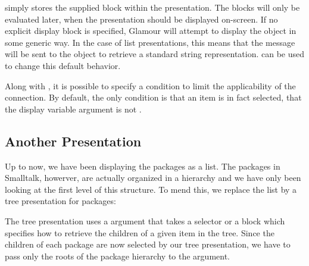 \documentclass[a4paper,10pt,twoside]{book}
\begin{document}
 simply stores the supplied block within the
presentation. The blocks will only be evaluated later, when the
presentation should be displayed on-screen. If no explicit display
block is specified, Glamour will attempt to display the object in some
generic way. In the case of list presentations, this means that the
 message will be sent to the object to retrieve a
standard string representation.  can be used to change
this default behavior.

Along with , it is possible to specify a 
condition to limit the applicability of the connection. By default,
the only condition is that an item is in fact selected, \ie{} that the
display variable argument is not .

\subsection{Another Presentation}

Up to now, we have been displaying the packages as a list. The
packages in Smalltalk, howerver, are actually organized in a hierarchy
and we have only been looking at the first level of this structure. To
mend this, we replace the list by a tree presentation for packages:



The tree presentation uses a  argument that takes a
selector or a block which specifies how to retrieve the children of a
given item in the tree. Since the children of each package are now
selected by our tree presentation, we have to pass only the roots of
the package hierarchy to the  argument.
\end{document}
